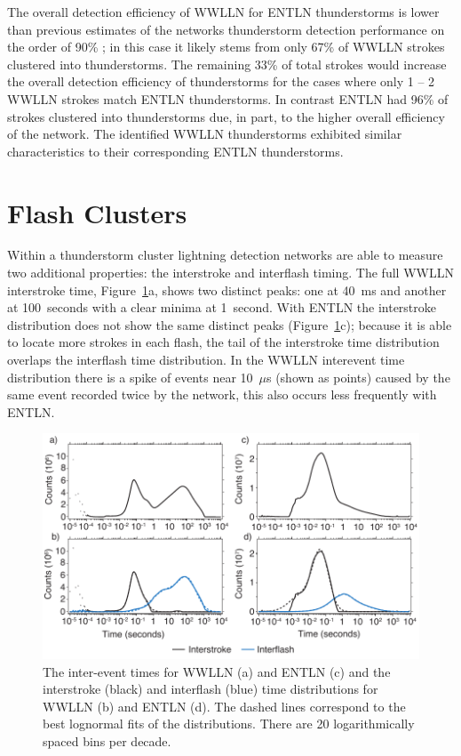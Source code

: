 The overall detection efficiency of WWLLN for ENTLN thunderstorms is lower than previous estimates of the networks thunderstorm detection performance on the order of 90\% \citep{Jacobson2006c}; in this case it likely stems from only 67\% of WWLLN strokes clustered into thunderstorms.
The remaining 33\% of total strokes would increase the overall detection efficiency of thunderstorms for the cases where only 1 -- 2 WWLLN strokes match ENTLN thunderstorms.
In contrast ENTLN had 96\% of strokes clustered into thunderstorms due, in part, to the higher overall efficiency of the network.
The identified WWLLN thunderstorms exhibited similar characteristics to their corresponding ENTLN thunderstorms.

\section{Flash Clusters}
\label{thunderstorm:sec:interflash}

Within a thunderstorm cluster lightning detection networks are able to measure two additional properties: the interstroke and interflash timing.
The full WWLLN interstroke time, Figure~\ref{thunderstorm:fig:interflash}a, shows two distinct peaks: one at 40~ms and another at 100~seconds with a clear minima at 1~second.
With ENTLN the interstroke distribution does not show the same distinct peaks (Figure~\ref{thunderstorm:fig:interflash}c); because it is able to locate more strokes in each flash, the tail of the interstroke time distribution overlaps the interflash time distribution.
In the WWLLN interevent time distribution there is a spike of events near 10~$\mu$s (shown as points) caused by the same event recorded twice by the network, this also occurs less frequently with ENTLN.

\begin{figure}[ht!]
   \centering
   \includegraphics[scale=1]{thunderstorm/Figures/interflash.pdf}
   \caption{The inter-event times for WWLLN (a) and ENTLN (c) and the interstroke (black) and interflash (blue) time distributions for WWLLN (b) and ENTLN (d).
           The dashed lines correspond to the best lognormal fits of the distributions.
           There are 20 logarithmically spaced bins per decade.}
   \label{thunderstorm:fig:interflash}
\end{figure}

